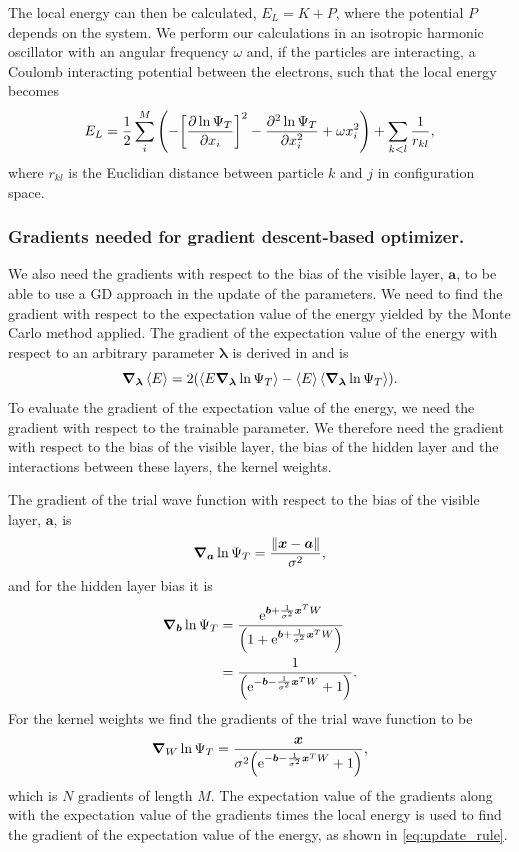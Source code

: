 The local energy can then be calculated, $E_L = K + P$, where the potential $P$ depends on the system. We perform our calculations in an isotropic harmonic oscillator with an angular frequency $\omega$ and, if the particles are interacting, a Coulomb interacting potential between the electrons, such that the local energy becomes 
\begin{equation}
    E_L = \frac{1}{2}\sum_i^M\qty(-\qty[\pdv{\ln{\Psi_T}}{x_i}]^2-\pdv[2]{\ln{\Psi_T}}{x_i} + \omega x_i^2) + \sum_{k<l}\frac{1}{r_{kl}},  
\end{equation}
where $r_{kl}$ is the Euclidian distance between particle $k$ and $j$ in configuration space. 
\subsubsection{Gradients needed for gradient descent-based optimizer.}
We also need the gradients with respect to the bias of the visible layer, $\bm{a}$, to be able to use a GD approach in the update of the parameters. We need to find the gradient with respect to the expectation value of the energy yielded by the Monte Carlo method applied. The gradient of the expectation value of the energy with respect to an arbitrary parameter $\bm{\lambda}$ is derived in \citep{project1} and is 
\begin{equation}\label{eq:update_rule}
    \grad_{\bm{\lambda}}\expval{E} = 2\qty(\expval{E\grad_{\bm{\lambda}}\ln{\Psi_T}} - \expval{E}\expval{\grad_{\bm{\lambda}}\ln{\Psi_T}}). 
\end{equation}
To evaluate the gradient of the expectation value of the energy, we need the gradient with respect to the trainable parameter. We therefore need the gradient with respect to the bias of the visible layer, the bias of the hidden layer and the interactions between these layers, the kernel weights. 

The gradient of the trial wave function with respect to the bias of the visible layer, $\bm{a}$, is 
\begin{equation}
    \grad_{\bm{a}}\ln{\Psi_T} = \frac{\norm{\bm{x}-\bm{a}}}{\sigma^2}, 
\end{equation}
and for the hidden layer bias it is 
\begin{align}
    \grad_{\bm{b}}\ln{\Psi_T} &= \frac{\mathrm{e}^{\bm{b} + \frac{1}{\sigma^2}\bm{x}^T W}}{\qty(1+\mathrm{e}^{\bm{b} + \frac{1}{\sigma^2}\bm{x}^T W})} \\
    &= \frac{1}{\qty(\mathrm{e}^{-\bm{b} - \frac{1}{\sigma^2}\bm{x}^T W}+1)}. 
\end{align}
For the kernel weights we find the gradients of the trial wave function to be 
\begin{equation}
    \grad_{W}\ln{\Psi_T} = \frac{\bm{x}}{\sigma^2\qty(\mathrm{e}^{-\bm{b}-\frac{1}{\sigma^2}\bm{x}^T W}+1)}, 
\end{equation}
which is $N$ gradients of length $M$. The expectation value of the gradients along with the expectation value of the gradients times the local energy is used to find the gradient of the expectation value of the energy, as shown in \autoref{eq:update_rule}.


